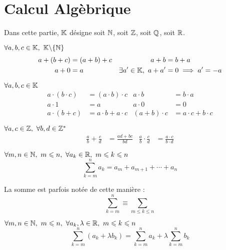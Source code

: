\chapter{Calcul Algèbrique}
\par \noindent Dans cette partie, $\mathbb{K}$ désigne soit $\mathbb{N}$, soit $\mathbb{Z}$, soit $\mathbb{Q}$, soit $\mathbb{R}$.

\begin{axiom}
    $\forall a, b, c \in \mathbb{K},\ \mathbb{K} \backslash \{\mathbb{N}\}$ 
    \begin{align*}
        a + (b + c) &= (a + b) + c & a + b &= b + a \\
        a + 0 &= a & \exists a' \in \mathbb{K},\ a + a' &= 0 \implies a' = -a
    \end{align*}
\end{axiom}

\begin{axiom}
    $\forall a, b, c \in \mathbb{K}$ 
    \begin{align*}
        a \cdot (b \cdot c) &= (a \cdot b) \cdot c & a \cdot b &= b \cdot a \\
        a \cdot 1 &= a & a \cdot 0 &= 0 \\
        a \cdot (b + c) &= a \cdot b + a \cdot c & (a + b) \cdot c &= a \cdot c + b \cdot c 
    \end{align*}
\end{axiom}

\begin{proposition}
    $\forall a, c \in \mathbb{Z},\ \forall b, d \in \mathbb{Z}^*$
    \begin{align*}
        \frac{a}{b} + \frac{c}{d} &= \frac{ad + bc}{bd} & \frac{a}{b} \cdot \frac{c}{d} &= \frac{a \cdot c}{b \cdot d}
    \end{align*}
\end{proposition}

\begin{definition}[Somme]
    $\forall m, n \in \mathbb{N},\ m \leqslant n,\ \forall a_k \in \mathbb{R},\ m \leqslant k \leqslant n$ 
    \[ \sum_{k = m}^n a_k = a_m + a_{m + 1} + \cdots + a_n \]
\end{definition}

\begin{notation}
    La somme est parfois notée de cette manière :
    \[ \sum_{k = m}^n \equiv \sum_{m \leq k \leq n} \]
\end{notation}

\begin{proposition}
    $\forall m, n \in \mathbb{N},\ m \leqslant n,\ \forall a_k, \lambda \in \mathbb{R},\ m \leqslant k \leqslant n$
    \[ \sum_{k = m}^{n} (a_k + \lambda b_k) = \sum_{k = m}^n a_k + \lambda \sum_{k = m}^n b_k \]
\end{proposition}

